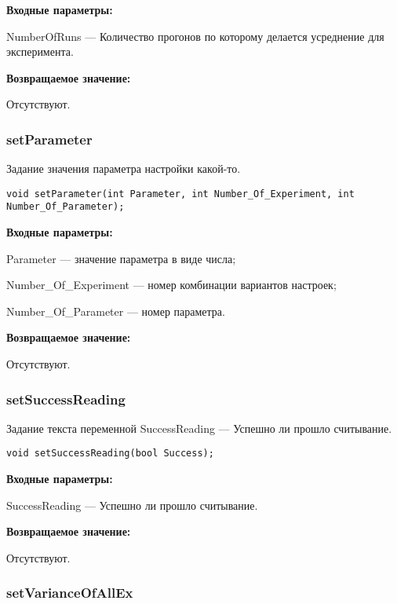 \documentclass[a4paper,12pt]{article}
\begin{document}
\textbf{Входные параметры:}

NumberOfRuns --- Количество прогонов по которому делается усреднение для эксперимента.

\textbf{Возвращаемое значение:}

Отсутствуют.


\subsubsection{setParameter}\label{setParameter}

Задание значения параметра настройки какой-то.


\begin{lstlisting}[label=code_syntax_setParameter,caption=Синтаксис]
void setParameter(int Parameter, int Number_Of_Experiment, int Number_Of_Parameter);
\end{lstlisting}

\textbf{Входные параметры:}

Parameter --- значение параметра в виде числа;

Number\_Of\_Experiment --- номер комбинации вариантов настроек;

Number\_Of\_Parameter --- номер параметра.

\textbf{Возвращаемое значение:}

Отсутствуют.


\subsubsection{setSuccessReading}\label{setSuccessReading}

Задание текста переменной SuccessReading --- Успешно ли прошло считывание.


\begin{lstlisting}[label=code_syntax_setSuccessReading,caption=Синтаксис]
void setSuccessReading(bool Success);
\end{lstlisting}

\textbf{Входные параметры:}

SuccessReading --- Успешно ли прошло считывание.

\textbf{Возвращаемое значение:}

Отсутствуют.


\subsubsection{setVarianceOfAllEx}\label{setVarianceOfAllEx}
\end{document}
